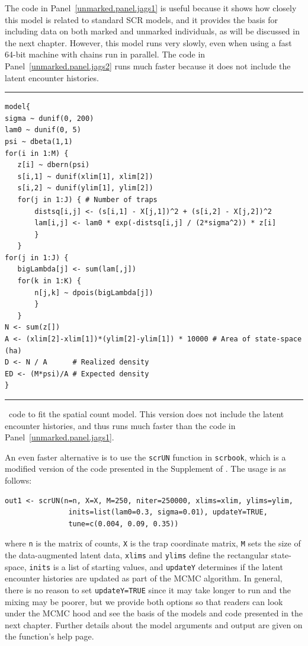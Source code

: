 The code in Panel~\ref{unmarked.panel.jags1} %
is useful because it shows how
closely this model is related to standard SCR models, and it provides
the basis for including data on both marked and unmarked individuals,
as will be discussed in the next chapter. However, this model runs
very slowly, even when using a fast 64-bit machine with chains run in parallel. The code
in Panel~\ref{unmarked.panel.jags2} runs much faster because it
does not include the latent encounter histories. %

\begin{panel}
\centering
\rule[0.05in]{\textwidth}{.03in}
\begin{small}
\begin{verbatim}
model{
sigma ~ dunif(0, 200)
lam0 ~ dunif(0, 5)
psi ~ dbeta(1,1)
for(i in 1:M) {
   z[i] ~ dbern(psi)
   s[i,1] ~ dunif(xlim[1], xlim[2])
   s[i,2] ~ dunif(ylim[1], ylim[2])
   for(j in 1:J) { # Number of traps
       distsq[i,j] <- (s[i,1] - X[j,1])^2 + (s[i,2] - X[j,2])^2
       lam[i,j] <- lam0 * exp(-distsq[i,j] / (2*sigma^2)) * z[i]
       }
   }
for(j in 1:J) {
   bigLambda[j] <- sum(lam[,j])
   for(k in 1:K) {
       n[j,k] ~ dpois(bigLambda[j])
       }
   }
N <- sum(z[])
A <- (xlim[2]-xlim[1])*(ylim[2]-ylim[1]) * 10000 # Area of state-space (ha)
D <- N / A      # Realized density
ED <- (M*psi)/A # Expected density
}
\end{verbatim}
\end{small}
\rule[0.15in]{\textwidth}{.03in}
\caption{\jags~code to fit the spatial count model. This version
  does not include the latent encounter histories, and thus runs much
  faster than the code in Panel~\ref{unmarked.panel.jags1}.}
\label{unmarked.panel.jags2}
\end{panel}



An even faster alternative is to use the \verb+scrUN+ function in
\texttt{scrbook}, which is a modified version of the code presented in
the Supplement of \citet{chandler_royle:2012}. The usage is as
follows:
\begin{verbatim}
out1 <- scrUN(n=n, X=X, M=250, niter=250000, xlims=xlim, ylims=ylim,
               inits=list(lam0=0.3, sigma=0.01), updateY=TRUE,
               tune=c(0.004, 0.09, 0.35))
\end{verbatim}
where \verb+n+ is the matrix of counts, \verb+X+ is the trap
coordinate matrix, \verb+M+ sets the size of the data-augmented latent
data, \verb+xlims+ and \verb+ylims+ define the
rectangular state-space, \verb+inits+ is a list of starting values,
and \verb+updateY+ determines if the latent encounter histories are
updated as part of the MCMC algorithm. In general, there is no reason
to set \verb+updateY=TRUE+ since it may take longer to run and the
mixing may be poorer, but we provide both options so that readers can
look under the MCMC hood and see the basis of the models and code
presented in the next chapter. Further details about the model
arguments and output are given on the function's help page.

